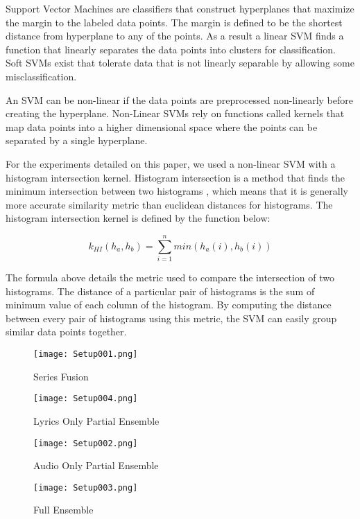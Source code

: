 Support Vector Machines are classifiers that construct hyperplanes that maximize the margin 
to the labeled data points. The margin is defined to be the shortest distance from hyperplane 
to any of the points. As a result a linear SVM finds a function that linearly separates the data
points into clusters for classification. Soft SVMs exist that tolerate data that is not linearly separable by allowing
some misclassification. 

An SVM can be non-linear if the data points are  preprocessed non-linearly before creating the hyperplane. 
Non-Linear SVMs rely on functions called kernels that map data points into a higher dimensional space where
the points can be separated by a single hyperplane. 

For the experiments detailed on this paper, we used a non-linear SVM with a histogram intersection kernel.
Histogram intersection is a method that finds the minimum intersection between two histograms \cite{maji2008classification}, which means 
that it is generally more accurate similarity metric than euclidean distances for histograms.  The histogram intersection kernel is 
defined by the function below:

\[ k_{HI}(h_a,h_b) = \sum_{i = 1}^n min(h_a(i),h_b(i))\]

The formula above details the metric used to compare the intersection of two histograms. The distance of a particular 
pair of histograms is the sum of minimum value of each column of the histogram.  By computing the distance between 
every pair of histograms using this metric, the SVM can easily group similar data points together. 

\begin{figure}
\begin{minipage}[b]{0.6\linewidth}
  \centering
  \hspace*{-.7in}
  \texttt{[image: Setup001.png]}
  \caption{Series Fusion}
  \label{fig:blah1}
\end{minipage}
\hfill
\begin{minipage}[b]{0.6\linewidth}
  \centering
    \hspace*{-.3in}
  \texttt{[image: Setup004.png]}
  \caption{Lyrics Only Partial Ensemble}
  \label{fig:blah2}
\end{minipage}

\vspace{1em} %


\begin{minipage}[b]{0.6\linewidth}
  \centering
  \hspace*{-0.7in}
  \texttt{[image: Setup002.png]}
  \caption{Audio Only Partial Ensemble}
  \label{fig:blah1}
\end{minipage}
\hfill
\begin{minipage}[b]{0.6\linewidth}
  \centering
      \hspace*{-.3in}
  \texttt{[image: Setup003.png]}
  \caption{Full Ensemble}
  \label{fig:blah2}
\end{minipage}
\end{figure}


